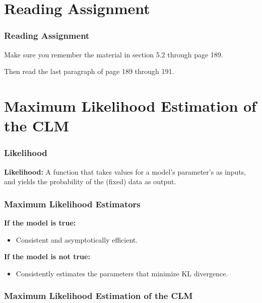 \documentclass[12pt, block=fill]{beamer}
\begin{document}
\section{Reading Assignment}

\begin{frame}
  \frametitle{Reading Assignment}
  
Make sure you remember the material in section 5.2 through page 189.

Then read the last paragraph of page 189 through 191.
\end{frame}

\section{Maximum Likelihood Estimation of the CLM}

\begin{frame}
  \frametitle{Likelihood}
  
  \textbf{Likelihood:} A function that takes values for a model's parameter's as inputs, and yields the probability of the (fixed) data as output.
\end{frame}


\begin{frame}
  \frametitle{Maximum Likelihood Estimators}
  
  \textbf{If the model is true:}
  \begin{itemize}
\item Consistent and asymptotically efficient.
\end{itemize}

\textbf{If the model is not true:}
\begin{itemize}
\item Consistently estimates the parameters that minimize KL divergence.
\end{itemize}


\end{frame}


\begin{frame}
  \frametitle{Maximum Likelihood Estimation of the CLM}
\end{frame}
\end{document}
